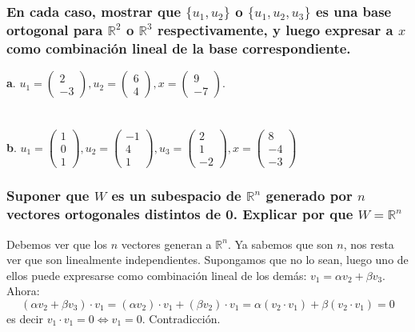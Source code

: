 \documentclass{article}
\begin{document}
\subsubsection{En cada caso, mostrar que $\{ u_1,u_2 \}$ o $\{ u_1,u_2,u_3\}$ es una base ortogonal
para $\mathbb{R}^2$ o $\mathbb{R}^3$ respectivamente, y luego expresar a $x$ como combinación lineal
de la base correspondiente.}
\textbf{a}. $u_1 = \begin{pmatrix}2\\-3\end{pmatrix}, u_2 = \begin{pmatrix}6\\4\end{pmatrix},
x = \begin{pmatrix}9\\-7\end{pmatrix}$. \\ \\ \\
\textbf{b}. $u_1 = \begin{pmatrix}1\\0\\1\end{pmatrix}, u_2 = \begin{pmatrix}-1\\4\\1\end{pmatrix}, u_3 = \begin{pmatrix}2\\1\\-2\end{pmatrix}, x = \begin{pmatrix}8\\-4\\-3\end{pmatrix}$

\subsubsection{Suponer que $W$ es un subespacio de $\mathbb{R}^n$ generado por $n$ vectores ortogonales distintos
de 0. Explicar por que $W = \mathbb{R}^n$}

Debemos ver que los $n$ vectores generan a $\mathbb{R}^n$. Ya sabemos que son $n$, nos resta ver que
son linealmente independientes. Supongamos que no lo sean, luego uno de ellos puede expresarse como
combinación lineal de los demás: $v_1 = \alpha v_2 + \beta v_3$. Ahora:
\[
(\alpha v_2 + \beta v_3)\cdot v_1 = (\alpha v_2) \cdot v_1 + (\beta v_2) \cdot v_1 = 
\alpha (v_2 \cdot v_1) + \beta (v_2 \cdot v_1) = 0
\]
es decir $v_1 \cdot v_1 = 0 \Longleftrightarrow v_1 = 0$. Contradicción.
\end{document}
